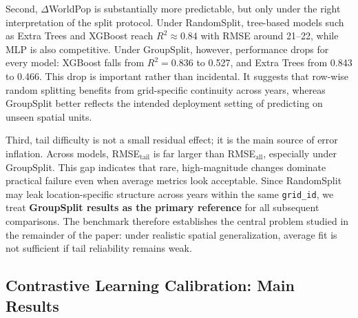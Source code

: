 \documentclass[pdflatex,sn-basic,Numbered]{sn-jnl}
\begin{document}
Second, $\Delta$WorldPop is substantially more predictable, but only under the right interpretation of the split protocol. Under RandomSplit, tree-based models such as Extra Trees and XGBoost reach $R^2 \approx 0.84$ with RMSE around 21--22, while MLP is also competitive. Under GroupSplit, however, performance drops for every model: XGBoost falls from $R^2=0.836$ to 0.527, and Extra Trees from 0.843 to 0.466. This drop is important rather than incidental. It suggests that row-wise random splitting benefits from grid-specific continuity across years, whereas GroupSplit better reflects the intended deployment setting of predicting on unseen spatial units.

Third, tail difficulty is not a small residual effect; it is the main source of error inflation. Across models, RMSE$_{\text{tail}}$ is far larger than RMSE$_{\text{all}}$, especially under GroupSplit. This gap indicates that rare, high-magnitude changes dominate practical failure even when average metrics look acceptable. Since RandomSplit may leak location-specific structure across years within the same \texttt{grid\_id}, we treat \textbf{GroupSplit results as the primary reference} for all subsequent comparisons. The benchmark therefore establishes the central problem studied in the remainder of the paper: under realistic spatial generalization, average fit is not sufficient if tail reliability remains weak.


\subsection{Contrastive Learning Calibration: Main Results}
\end{document}
